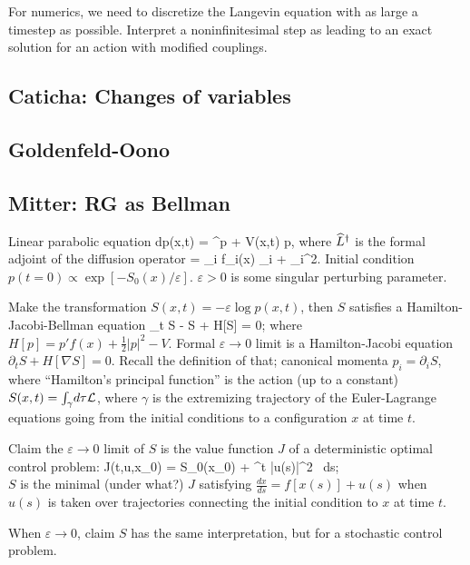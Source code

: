 \documentclass[notitlepage,openany,11pt]{report}
\theoremstyle{plain}%
\numberwithin{equation}{section}
\begin{document}
For numerics, we need to discretize the Langevin equation with as large a timestep as possible. Interpret a noninfinitesimal step as leading to an exact solution for an action with modified couplings.


\subsection{Caticha: Changes of variables}
\cite{Caticha:17}


\subsection{Goldenfeld-Oono}

\subsection{Mitter: RG as Bellman}
\cite{Mitter:89}

Linear parabolic equation
\be
dp(x,t) = ^{\dagger}p +  V(x,t) p,
\ee
where $\widehat{L}^{\dagger}$ is the formal adjoint of the diffusion operator 
\be
{} = \sum_{i} f_{i}(x) \partial_{i} +  \partial_{i}^{2}.
\ee
Initial condition $p(t=0) \propto \exp[ - S_{0}(x)/\varepsilon]$. $\varepsilon >0$ is some singular perturbing parameter.

Make the transformation $S(x,t) = -\varepsilon \log p(x,t)$, then $S$ satisfies a Hamilton-Jacobi-Bellman equation
\be
\partial_{t} S -  \Delta S + H[\nabla S] = 0;
\ee
where $H[p] = p'f(x) + \frac{1}{2} |p|^{2} - V$. Formal $\varepsilon \to 0$ limit is a Hamilton-Jacobi equation $\partial_{t} S + H[\nabla S] = 0$. Recall the definition of that; canonical momenta $p_{i} = \partial_{i}S$, where ``Hamilton's principal function'' is the action (up to a constant) $S(x,t) = \int_{\gamma} \! d\tau \mathcal{L}$, where $\gamma$ is the extremizing trajectory of the Euler-Lagrange equations going from the initial conditions to a configuration $x$ at time $t$.

Claim the $\varepsilon \to 0$ limit of $S$ is the value function $J$ of a deterministic optimal control problem:
\be
J(t,u,x_{0}) = S_{0}(x_{0}) +  \int^{t} |u(s)|^{2} \, ds; \\
\ee
$S$ is the minimal (under what?) $J$ satisfying $\frac{dx}{ds} = f[x(s)] + u(s)$ when $u(s)$ is taken over trajectories connecting the initial condition to $x$ at time $t$.

When $\varepsilon \to 0$, claim $S$ has the same interpretation, but for a stochastic control problem.
\end{document}
